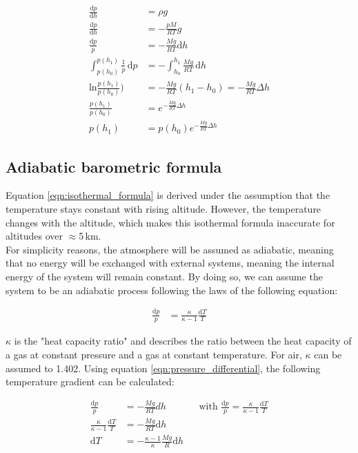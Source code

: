 \documentclass[fontsize=11pt,%
twoside,%
BCOR          = 8mm, %
DIV           = 11,  %
titlepage     = off,%
index=totoc,%
xcolor        = pdftex,%
dvipsnames,%
bibliography  = totoc,%
bibliography = numbered, %
listof        = notnumbered]{scrreprt}
\begin{document}
\begin{align}
	\frac{\text{d}p}{\text{d}h} &= \rho g\\
	\frac{\text{d}p}{\text{d}h} &= -\frac{pM}{RT}g\\
	\frac{\text{d}p}{p} &= -\frac{Mg}{RT}\text{d}h \label{eqn:pressure_differential}\\
	\int_{p(h_0)}^{p(h_1)} \frac{1}{p} \, \text{d}p &= -\int_{h_0}^{h_1} \frac{Mg}{RT} \, \text{d}h\\
	\text{ln}\frac{p(h_1)}{p(h_0)}) &= -\frac{Mg}{RT}(h_1-h_0) = -\frac{Mg}{RT}\Delta h\\
	\frac{p(h_1)}{p(h_0)} &= e^{-\frac{Mg}{RT}\Delta h}\\
	p(h_1) &= p(h_0)e^{-\frac{Mg}{RT}\Delta h}
	\label{eqn:isothermal_formula}
\end{align}


\subsection{Adiabatic barometric formula}
Equation \ref{eqn:isothermal_formula} is derived under the assumption that the temperature stays constant with rising altitude. However, the temperature changes with the altitude, which makes this isothermal formula inaccurate for altitudes over $\approx$5\,km.\\
For simplicity reasons, the atmosphere will be assumed as adiabatic, meaning that no energy will be exchanged with external systems, meaning the internal energy of the system will remain constant. By doing so, we can assume the system to be an adiabatic process following the laws of the following equation:

\begin{align}
	\frac{\text{d}p}{p} &= \frac{\kappa}{\kappa -1} \frac{\text{d}T}{T}
	\label{eqn:adiabatic_process}
\end{align}

$\kappa$ is the "heat capacity ratio" and describes the ratio between the heat capacity of a gas at constant pressure and a gas at constant temperature. For air, $\kappa$ can be assumed to 1.402. Using equation \ref{eqn:pressure_differential}, the following temperature gradient can be calculated:

\begin{align}
	\frac{\text{d}p}{p} &= -\frac{Mg}{RT}dh && \text{with } \frac{\text{d}p}{p} = \frac{\kappa}{\kappa - 1} \frac{\text{d}T}{T}\\
	\frac{\kappa}{\kappa - 1} \frac{\text{d}T}{T} &= -\frac{Mg}{RT}\text{d}h\\
	{\text{d}T} &= - \frac{\kappa - 1}{\kappa} \frac{Mg}{R}\text{d}h
\end{align}
\end{document}

